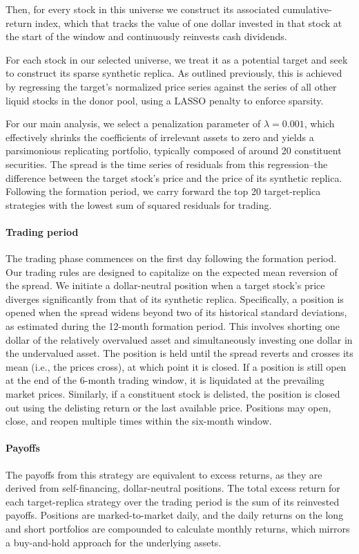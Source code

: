 Then, for every stock in this universe we construct its associated cumulative-return index, which that tracks the value of one dollar invested in that stock at the start of the window and continuously reinvests cash dividends.

For each stock in our selected universe, we treat it as a potential target and seek to construct its sparse synthetic replica. As outlined previously, this is achieved by regressing the target's normalized price series against the series of all other liquid stocks in the donor pool, using a LASSO penalty to enforce sparsity. 

For our main analysis, we select a penalization parameter of $\lambda=0.001$, which effectively shrinks the coefficients of irrelevant assets to zero and yields a parsimonious replicating portfolio, typically composed of around 20 constituent securities. The spread is the time series of residuals from this regression--the difference between the target stock's price and the price of its synthetic replica. Following the formation period, we carry forward the top 20 target-replica strategies with the lowest sum of squared residuals for trading.

\paragraph{Trading period}

The trading phase commences on the first day following the formation period. Our trading rules are designed to capitalize on the expected mean reversion of the spread. We initiate a dollar-neutral position when a target stock's price diverges significantly from that of its synthetic replica. Specifically, a position is opened when the spread widens beyond two of its historical standard deviations, as estimated during the 12-month formation period. This involves shorting one dollar of the relatively overvalued asset and simultaneously investing one dollar in the undervalued asset. The position is held until the spread reverts and crosses its mean (i.e., the prices cross), at which point it is closed. If a position is still open at the end of the 6-month trading window, it is liquidated at the prevailing market prices. Similarly, if a constituent stock is delisted, the position is closed out using the delisting return or the last available price. Positions may open, close, and reopen multiple times within the six-month window.


\paragraph{Payoffs}
The payoffs from this strategy are equivalent to excess returns, as they are derived from self-financing, dollar-neutral positions. The total excess return for each target-replica strategy over the trading period is the sum of its reinvested payoffs. Positions are marked-to-market daily, and the daily returns on the long and short portfolios are compounded to calculate monthly returns, which mirrors a buy-and-hold approach for the underlying assets.

